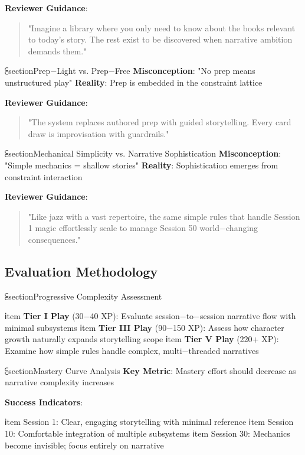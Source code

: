 \textbf{Reviewer Guidance}: 
\begin{quote}
"Imagine a library where you only need to know about the books relevant to today's story. The rest exist to be discovered when narrative ambition demands them."
\end{quote}

⫕section{Prep−Light vs. Prep−Free}
\textbf{Misconception}: "No prep means unstructured play"
\textbf{Reality}: Prep is embedded in the constraint lattice

\textbf{Reviewer Guidance}:
\begin{quote}
"The system replaces authored prep with guided storytelling. Every card draw is improvisation with guardrails."
\end{quote}

⫕section{Mechanical Simplicity vs. Narrative Sophistication}
\textbf{Misconception}: "Simple mechanics = shallow stories"
\textbf{Reality}: Sophistication emerges from constraint interaction

\textbf{Reviewer Guidance}:
\begin{quote}
"Like jazz with a vast repertoire, the same simple rules that handle Session 1 magic effortlessly scale to manage Session 50 world−changing consequences."
\end{quote}

\subsection{Evaluation Methodology}

⫕section{Progressive Complexity Assessment}
\begin{enumerate}
    ℹtem \textbf{Tier I Play} (30−40 XP): Evaluate session−to−session narrative flow with minimal subsystems
    ℹtem \textbf{Tier III Play} (90−150 XP): Assess how character growth naturally expands storytelling scope  
    ℹtem \textbf{Tier V Play} (220+ XP): Examine how simple rules handle complex, multi−threaded narratives
\end{enumerate}

⫕section{Mastery Curve Analysis}
\textbf{Key Metric}: Mastery effort should decrease as narrative complexity increases

\textbf{Success Indicators}:
\begin{itemize}
    ℹtem Session 1: Clear, engaging storytelling with minimal reference
    ℹtem Session 10: Comfortable integration of multiple subsystems
    ℹtem Session 30: Mechanics become invisible; focus entirely on narrative
\end{itemize}


